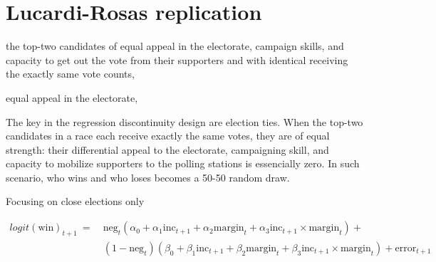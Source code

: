 \documentclass[letter,12pt]{article}
\begin{document}


\section{Lucardi-Rosas replication}

the top-two candidates of equal appeal in the electorate, campaign skills, and capacity to get out the vote from their supporters and with identical receiving the exactly same vote counts, 

equal appeal in the electorate, 

The key in the regression discontinuity design are election ties. When the top-two candidates in a race each receive exactly the same votes, they are of equal strength: their differential appeal to the electorate, campaigning skill, and capacity to mobilize supporters to the polling stations is essencially zero. In such scenario, who wins and who loses becomes a 50-50 random draw.

Focusing on close elections only 

\begin{equation}
  \begin{split}
  logit(\text{win})_{t+1} ~=~ & \text{neg}_t (\alpha_0 + \alpha_1 \text{inc}_{t+1} + \alpha_2 \text{margin}_t + \alpha_3 \text{inc}_{t+1} \times \text{margin}_t) + \\
                             & (1 - \text{neg}_t) (\beta_0 + \beta_1 \text{inc}_{t+1} + \beta_2 \text{margin}_t + \beta_3 \text{inc}_{t+1} \times \text{margin}_t) + \text{error}_{t+1}
  \end{split}
\end{equation}
\end{document}
